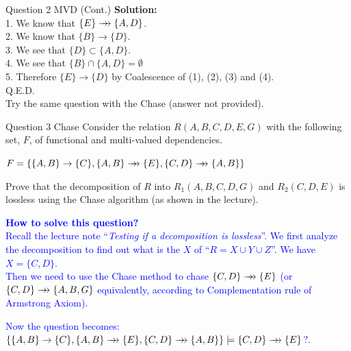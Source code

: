 \begin{frame}[fragile]{Question 2 MVD (Cont.)}
\textbf{Solution:}\\ \vspace{5pt}
1. We know that $\{E\}\mbox{$\; \rightarrow \! \! \! \! \rightarrow \; $}\{A,D\}$.\\ \vspace{2pt}
2. We know that $\{B\}\rightarrow\{D\}$.\\\vspace{2pt}
3. We see that $\{D\}\subset\{A,D\}$.\\\vspace{2pt}
4. We see that $\{B\}\cap \{A,D\}=\emptyset$\\\vspace{2pt}
5. Therefore $\{E\}\rightarrow\{D\}$ by Coalescence of (1), (2), (3) and (4).\\\vspace{2pt}
\hfill Q.E.D.\\\vspace{10pt}
Try the same question with the Chase (answer not provided).
\end{frame}

\begin{frame}[fragile]{Question 3 Chase}
Consider the relation $R(A,B,C,D,E,G)$ with the following set, $F$, of functional and multi-valued dependencies.\\ \vspace{5pt}
	
$F=\{\{A,B\}\rightarrow\{C\}, \{A,B\}\mvd\{E\},\{C,D\}\mvd\{A,B\}\}$\\ \vspace{5pt}
	
Prove that the decomposition of $R$ into $R_1(A,B,C,D,G)$ and $R_2(C,D,E)$ is lossless using the Chase algorithm (as shown in the lecture).\\ \vspace{5pt}

\textbf{\textcolor{blue}{How to solve this question?}}\\\vspace{5pt}
\textcolor{blue}{Recall the lecture note ``\emph{Testing if a decomposition is lossless}''.
We first analyze the decomposition to find out what is the $X$ of ``$R=X\cup Y\cup Z$''. We have $X=\{C,D\}$.\\\vspace{2pt}
Then we need to use the Chase method to chase $\{C,D\}\mbox{$\; \rightarrow \! \! \! \! \rightarrow \; $}\{E\}$ ({\small or $\{C,D\}\mbox{$\; \rightarrow \! \! \! \! \rightarrow \; $}\{A,B,G\}$ equivalently, according to Complementation rule of Armstrong Axiom}).}\\\vspace{5pt}

\textcolor{blue}{Now the question becomes:\\
$\{\{A,B\}\rightarrow\{C\}, \{A,B\}\mvd\{E\},\{C,D\}\mvd\{A,B\}\} \models \{C,D\}\mvd\{E\}$?.}
\end{frame}

